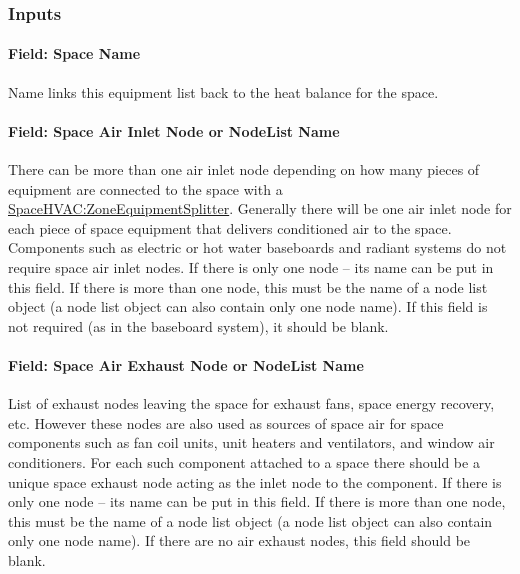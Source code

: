 \subsubsection{Inputs}\label{inputs-space-1-052}

\paragraph{Field: Space Name}\label{field-space-name-015}

Name links this equipment list back to the heat balance for the space.

\paragraph{Field: Space Air Inlet Node or NodeList Name}\label{field-space-air-inlet-node-or-nodelist-name}

There can be more than one air inlet node depending on how many pieces of equipment are connected to the space with a \hyperref[spacehvaczoneequipmentsplitter]{SpaceHVAC:ZoneEquipmentSplitter}. Generally there will be one air inlet node for each piece of space equipment that delivers conditioned air to the space. Components such as electric or hot water baseboards and radiant systems do not require space air inlet nodes. If there is only one node -- its name can be put in this field. If there is more than one node, this must be the name of a node list object (a node list object can also contain only one node name). If this field is not required (as in the baseboard system), it should be blank.

\paragraph{Field: Space Air Exhaust Node or NodeList Name}\label{field-space-air-exhaust-node-or-nodelist-name}

List of exhaust nodes leaving the space for exhaust fans, space energy recovery, etc. However these nodes are also used as sources of space air for space components such as fan coil units, unit heaters and ventilators, and window air conditioners. For each such component attached to a space there should be a unique space exhaust node acting as the inlet node to the component. If there is only one node -- its name can be put in this field. If there is more than one node, this must be the name of a node list object (a node list object can also contain only one node name). If there are no air exhaust nodes, this field should be blank.

